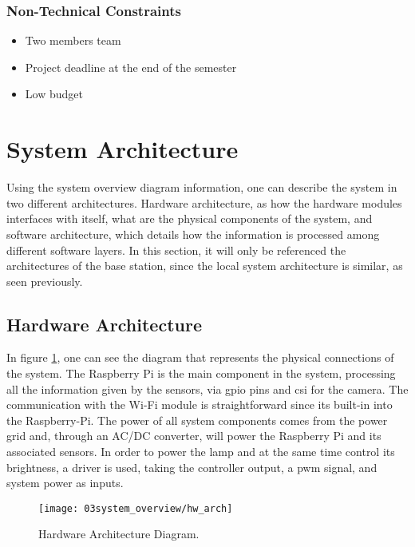 \subsubsection{Non-Technical Constraints}
\begin{itemize}
        \item Two members team
        \item Project deadline at the end of the semester
        \item Low budget
\end{itemize}

\section{System Architecture}
Using the system overview diagram information, one can describe the system in two different architectures. Hardware architecture, as how the hardware modules interfaces with itself, what are the physical components of the system, and software architecture, which details how the information is processed among different software layers. In this section, it will only be referenced the architectures of the base station, since the local system architecture is similar, as seen previously. 

\subsection{Hardware Architecture}
In figure \ref{fig:hw_arch}, one can see the diagram that represents the physical connections of the system. The Raspberry Pi is the main component in the system, processing all the information given by the sensors, via \ac{gpio} pins and \ac{csi} for the camera. The communication with the Wi-Fi module is straightforward since its built-in into the Raspberry-Pi.
The power of all system components comes from the power grid and, through an AC/DC converter, will power the Raspberry Pi and its associated sensors.
In order to power the lamp and at the same time control its brightness, a driver is used, taking the controller output, a \ac{pwm} signal, and system power as inputs. 

\begin{figure}[ht]
	\centering
	\texttt{[image: 03system\_overview/hw\_arch]}
	\caption{Hardware Architecture Diagram.}
	\label{fig:hw_arch}
\end{figure}

